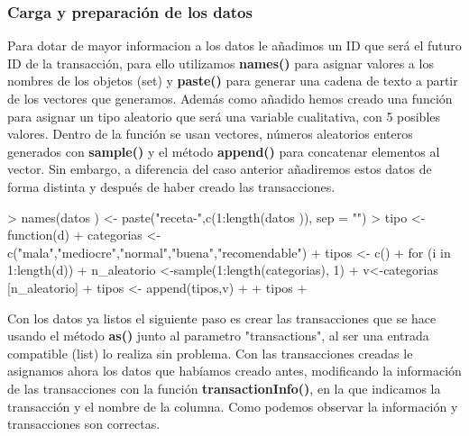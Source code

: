 \documentclass [a4paper] {article}
\begin{document}
\subsubsection{Carga y preparación de los datos}
\begin{Schunk}
\end{Schunk}
Para dotar de mayor informacion a los datos le añadimos un ID que será el futuro ID de la transacción, para ello utilizamos \textbf{names()} para asignar valores a
los nombres de los objetos (set) y \textbf{paste()} para generar una cadena de texto a partir de los vectores que generamos. Además como añadido hemos creado una 
función para asignar un tipo aleatorio que será una variable cualitativa, con 5 posibles valores. Dentro de la función se usan vectores, números aleatorios enteros
generados con \textbf{sample()} y el método \textbf{append()} para concatenar elementos al vector. Sin embargo, a diferencia del caso anterior añadiremos estos datos de forma distinta
y después de haber creado las transacciones.
\begin{Schunk}
\begin{Sinput}
> names(datos ) <- paste("receta-",c(1:length(datos )), sep = "")
> tipo <- function(d){
+     categorias <- c("mala","mediocre","normal","buena","recomendable")
+     tipos <- c()
+     for (i in 1:length(d)){
+         n_aleatorio <-sample(1:length(categorias), 1)
+         v<-categorias [n_aleatorio]
+         tipos <- append(tipos,v)
+     }
+     tipos 
+ }
\end{Sinput}
\end{Schunk}
Con los datos ya listos el siguiente paso es crear las transacciones que se hace usando el método \textbf{as()} junto al parametro "transactions", al ser una entrada compatible (list)
lo realiza sin problema. Con las transacciones creadas le asignamos ahora los datos que habíamos creado antes, modificando la información de las transacciones con la función
\textbf{transactionInfo()}, en la que indicamos la transacción y el nombre de la columna. Como podemos observar la información y transacciones son correctas.
\end{document}
